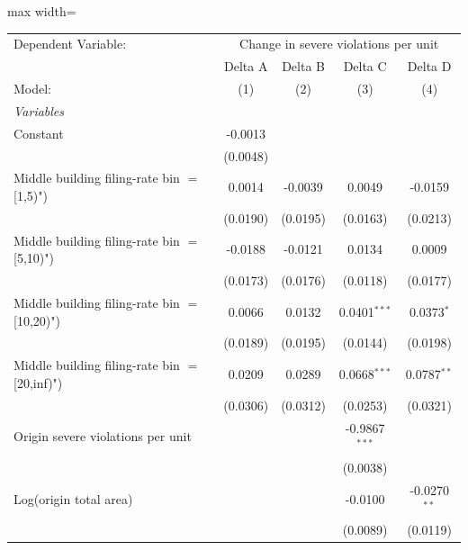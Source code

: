 \documentclass[
  11pt,
]{article}
\begin{document}
\begin{adjustbox}{max width=\textwidth}
\begingroup
\centering
\begin{tabular}{lcccc}
   \tabularnewline \midrule \midrule
   Dependent Variable: & \multicolumn{4}{c}{Change in severe violations per unit}\\
                                                  & Delta A  & Delta B  & Delta C         & Delta D \\   
   Model:                                         & (1)      & (2)      & (3)             & (4)\\  
   \midrule
   \emph{Variables}\\
   Constant                                       & -0.0013  &          &                 &   \\   
                                                  & (0.0048) &          &                 &   \\   
   Middle building filing-rate bin $=$ [1,5)")    & 0.0014   & -0.0039  & 0.0049          & -0.0159\\   
                                                  & (0.0190) & (0.0195) & (0.0163)        & (0.0213)\\   
   Middle building filing-rate bin $=$ [5,10)")   & -0.0188  & -0.0121  & 0.0134          & 0.0009\\   
                                                  & (0.0173) & (0.0176) & (0.0118)        & (0.0177)\\   
   Middle building filing-rate bin $=$ [10,20)")  & 0.0066   & 0.0132   & 0.0401$^{***}$  & 0.0373$^{*}$\\   
                                                  & (0.0189) & (0.0195) & (0.0144)        & (0.0198)\\   
   Middle building filing-rate bin $=$ [20,inf)") & 0.0209   & 0.0289   & 0.0668$^{***}$  & 0.0787$^{**}$\\   
                                                  & (0.0306) & (0.0312) & (0.0253)        & (0.0321)\\   
   Origin severe violations per unit              &          &          & -0.9867$^{***}$ &   \\   
                                                  &          &          & (0.0038)        &   \\   
   Log(origin total area)                         &          &          & -0.0100         & -0.0270$^{**}$\\   
                                                  &          &          & (0.0089)        & (0.0119)\\   

\end{tabular}
\end{adjustbox}
\end{document}
